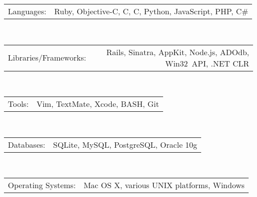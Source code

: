 \documentclass[12pt,letterpaper]{article}
\makeatletter
\newenvironment{indentedsection}[1]
{\begin{list}{}
  {\setlength{\leftmargin}{#1}}
  \item[]
}
{\end{list}}
\newcommand{\floatcols}[2]
{\begin{tabular*}{\linewidth}{l@{\extracolsep{\fill}}r}
  #1 &
  #2 \\
\end{tabular*}}
\newcommand{\CPP}
{C\nolinebreak[4]\hspace{-.05em}\raisebox{.22ex}{\footnotesize\bf ++}}
\makeatother
\begin{document}
\begin{indentedsection}{\parindent}
  \floatcols
    {Languages:}
    {Ruby, Objective-C, C, \CPP, Python, JavaScript, PHP, C\#}
  \\[.4em]
  \floatcols
    {Libraries/Frameworks:}
    {Rails, Sinatra, AppKit, Node.js, ADOdb, Win32~API, .NET CLR}
  \\[.4em]
  \floatcols
    {Tools:}
    {Vim, TextMate, Xcode, BASH, Git}
  \\[.4em]
  \floatcols
    {Databases:}
    {SQLite, MySQL, PostgreSQL, Oracle 10g}
  \\[.4em]
  \floatcols
    {Operating Systems:}
    {Mac OS X, various UNIX platforms, Windows}
\end{indentedsection}
\end{document}
